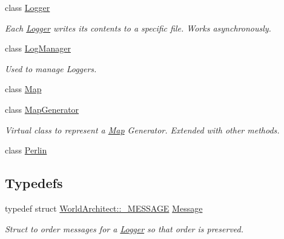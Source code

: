 \begin{DoxyCompactItemize}
class \mbox{\hyperlink{class_world_architect_1_1_logger}{Logger}}
\begin{DoxyCompactList}\small\item\em Each \mbox{\hyperlink{class_world_architect_1_1_logger}{Logger}} writes it\textquotesingle{}s contents to a specific file. Works asynchronously. \end{DoxyCompactList}\item 
class \mbox{\hyperlink{class_world_architect_1_1_log_manager}{Log\+Manager}}
\begin{DoxyCompactList}\small\item\em Used to manage Loggers. \end{DoxyCompactList}\item 
class \mbox{\hyperlink{class_world_architect_1_1_map}{Map}}
\item 
class \mbox{\hyperlink{class_world_architect_1_1_map_generator}{Map\+Generator}}
\begin{DoxyCompactList}\small\item\em Virtual class to represent a \mbox{\hyperlink{class_world_architect_1_1_map}{Map}} Generator. Extended with other methods. \end{DoxyCompactList}\item 
class \mbox{\hyperlink{class_world_architect_1_1_perlin}{Perlin}}
\end{DoxyCompactItemize}
\subsection*{Typedefs}
\begin{DoxyCompactItemize}
\item 
typedef struct \mbox{\hyperlink{struct_world_architect_1_1___m_e_s_s_a_g_e}{World\+Architect\+::\+\_\+\+M\+E\+S\+S\+A\+GE}} \mbox{\hyperlink{namespace_world_architect_a43ffc83197b30a5636e3dc65fba782a1}{Message}}
\begin{DoxyCompactList}\small\item\em Struct to order messages for a \mbox{\hyperlink{class_world_architect_1_1_logger}{Logger}} so that order is preserved. \end{DoxyCompactList}\end{DoxyCompactItemize}
